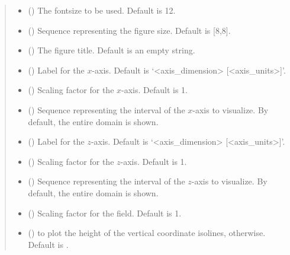 \documentclass[letterpaper,10pt,english]{sphinxmanual}
\begin{document}
\begin{fulllineitems}
\begin{quote}
\begin{description}
\begin{itemize}
\item {} 
 () \textendash{} The fontsize to be used. Default is 12.

\item {} 
 () \textendash{} Sequence representing the figure size. Default is {[}8,8{]}.

\item {} 
 () \textendash{} The figure title. Default is an empty string.

\item {} 
 () \textendash{} Label for the \(x\)-axis. Default is ‘\textless{}axis\_dimension\textgreater{} {[}\textless{}axis\_units\textgreater{}{]}’.

\item {} 
 () \textendash{} Scaling factor for the \(x\)-axis. Default is 1.

\item {} 
 () \textendash{} Sequence representing the interval of the \(x\)-axis to visualize. By default, the entire domain is shown.

\item {} 
 () \textendash{} Label for the \(z\)-axis. Default is ‘\textless{}axis\_dimension\textgreater{} {[}\textless{}axis\_units\textgreater{}{]}’.

\item {} 
 () \textendash{} Scaling factor for the \(z\)-axis. Default is 1.

\item {} 
 () \textendash{} Sequence representing the interval of the \(z\)-axis to visualize. By default, the entire domain is shown.

\item {} 
 () \textendash{} Scaling factor for the field. Default is 1.

\item {} 
 () \textendash{}  to plot the height of the vertical coordinate isolines,  otherwise. Default is .


\end{itemize}
\end{description}
\end{quote}
\end{fulllineitems}
\end{document}
